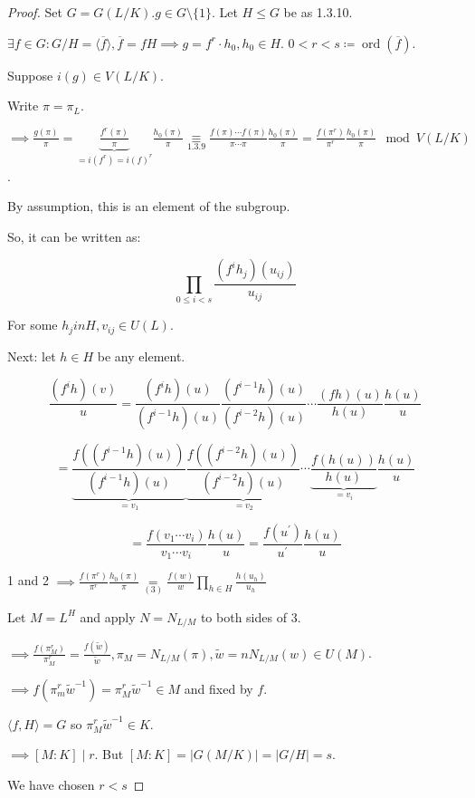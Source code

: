 \documentclass{article}
\theoremstyle{definition}
\numberwithin{theorem}{subsection}
\begin{document}
    \begin{proof}
        Set \(G = G(L / K). g\in G \setminus \{ 1 \}\). Let \(H \leq G\) be as 1.3.10.

        \(\exists f \in G: G / H = \langle \overline{f} \rangle, \overline{f} = fH \implies g = f ^{r} \cdot h_0, h_0 \in H\). \(0 < r < s \coloneqq \operatorname{ord}(\overline{f})\).

        Suppose \(i(g) \in V(L / K)\).

        Write \(\pi = \pi_L\).

        \(\implies \frac{g(\pi)}{\pi} = \underbrace{\frac{f^r (\pi)}{\pi}}_{= i(f^r) = i(f)^r} \frac{h_0(\pi)}{\pi} \underset{1.3.9}{\equiv} \frac{f(\pi) \cdots f(\pi)}{\pi \cdots \pi} \frac{h_0(\pi)}{\pi} = \frac{f(\pi^r)}{\pi^r} \frac{h_0(\pi)}{\pi} \mod V(L / K)\).

        By assumption, this is an element of the subgroup.
        
        So, it can be written as:
        
        \[
            \prod_{0 \leq i < s} \frac{(f^i h_j) (u_{ij})}{u_{ij}} \tag*{(1)}
        \]

        For some \(h_j in H, v_{ij} \in U(L)\).

        Next: let \(h\in H\) be any element.

        \[
            \frac{(f^i h)(v)}{u} = \frac{(f^i h)(u)}{(f^{i-1}h)(u)} \frac{(f^{i-1}h)(u)}{(f^{i-2}h)(u)} \cdots \frac{(fh)(u)}{h(u)} \frac{h(u)}{u}
        \]

        \[
            = \underbrace{\frac{f((f^{i-1}h)(u))}{(f^{i-1}h)(u)}}_{=v_1} \underbrace{\frac{f((f^{i-2}h)(u))}{(f^{i-2}h)(u)}}_{=v_2} \cdots \underbrace{\frac{f(h(u))}{h(u)}}_{=v_i} \frac{h(u)}{u} \tag*{(2)}
        \]

        \[
            = \frac{f(v_1 \cdots v_i)}{v_1 \cdots v_i} \frac{h(u)}{u} = \frac{f(u^{\prime})}{u^{\prime}} \frac{h(u)}{u}
        \]

        1 and 2 \(\implies \frac{f(\pi^r)}{\pi^r} \frac{h_0(\pi)}{\pi} \underset{(3)}{=} \frac{f(w)}{w} \prod_{h\in H} \frac{h(u_h)}{u_h} \) 

        Let \(M = L^H\) and apply \(N = N_{L / M}\) to both sides of \(3\).

        \(\implies \frac{f(\pi_M^r)}{\pi_M^r} = \frac{f(\widetilde{w})}{\widetilde{w}}, \pi_M = N_{L / M}(\pi), \widetilde{w} =n N_{L / M}(w) \in U(M)\).
        
        \(\implies f(\pi_m^r \widetilde{w}^{-1}) = \pi_M^r \widetilde{w} ^{-1} \in M\) and fixed by \(f\).
        
        \(\langle f, H \rangle = G\) so \(\pi_M^r \widetilde{w} ^{-1} \in K\).
        
        \(\implies [M : K] \mid r\). But \([M:K] = \vert G(M / K) \vert  = \vert G / H \vert = s\).
        
        We have chosen \(r < s\) 

    \end{proof}
\end{document}
